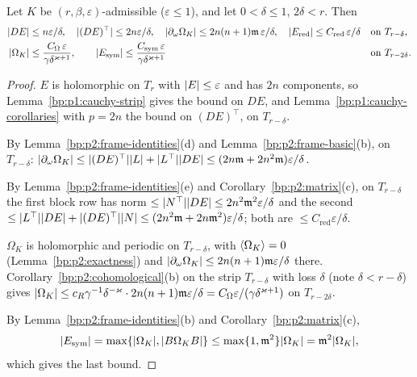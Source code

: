 \begin{lemma}\label{bp:p2:geometry}
Let $K$ be $(r,\beta,\varepsilon)$-admissible ($\varepsilon\le1$), and let $0<\delta\le1$, $2\delta<r$.
Then
\begin{align*}
\lvert DE\rvert&\le n\varepsilon/\delta,\quad\lvert (DE)^\top\rvert\le2n\varepsilon/\delta,\quad
\lvert \partial_\omega\Omega_K\rvert\le2n(n+1)\mathfrak m\,\varepsilon/\delta,\quad
\lvert E_{\mathrm{red}}\rvert\le C_{\mathrm{red}}\,\varepsilon/\delta&&\text{on }T_{r-\delta},\\
\lvert \Omega_K\rvert&\le\frac{C_\Omega\,\varepsilon}{\gamma\delta^{\varkappa+1}},\qquad
\lvert E_{\mathrm{sym}}\rvert\le\frac{C_{\mathrm{sym}}\,\varepsilon}{\gamma\delta^{\varkappa+1}}&&\text{on }
T_{r-2\delta}.
\end{align*}
\end{lemma}

\begin{proof}
\label{step:p2:geo-de}
$E$ is holomorphic on $T_r$ with $\lvert E\rvert\le\varepsilon$ and has $2n$ components, so
Lemma~\ref{bp:p1:cauchy-strip} gives the bound on $DE$, and Lemma~\ref{bp:p1:cauchy-corollaries} with
$p=2n$ the bound on $(DE)^\top$, on $T_{r-\delta}$.

\label{step:p2:geo-domegak}
By Lemma~\ref{bp:p2:frame-identities}(d) and Lemma~\ref{bp:p2:frame-basic}(b), on $T_{r-\delta}$:
$\lvert \partial_\omega\Omega_K\rvert\le\lvert (DE)^\top\rvert\lvert L\rvert+\lvert L^\top\rvert\lvert DE\rvert\le
(2n\mathfrak m+2n^2\mathfrak m)\varepsilon/\delta$.

\label{step:p2:geo-ered}
By Lemma~\ref{bp:p2:frame-identities}(e) and Corollary~\ref{bp:p2:matrix}(c), on $T_{r-\delta}$ the first
block row has norm $\le\lvert N^\top\rvert\lvert DE\rvert\le2n^2\mathfrak m^2\varepsilon/\delta$ and the second
$\le\lvert L^\top\rvert\lvert DE\rvert+\lvert (DE)^\top\rvert\lvert N\rvert\le(2n^2\mathfrak m+2n\mathfrak m^2)\varepsilon/\delta$;
both are $\le C_{\mathrm{red}}\varepsilon/\delta$.

\label{step:p2:geo-omegak}
$\Omega_K$ is holomorphic and periodic on $T_{r-\delta}$, with $\langle \Omega_K\rangle=0$
(Lemma~\ref{bp:p2:exactness}) and $\lvert \partial_\omega\Omega_K\rvert\le2n(n+1)\mathfrak m\varepsilon/\delta$
there. Corollary~\ref{bp:p2:cohomological}(b) on the strip $T_{r-\delta}$ with loss $\delta$ (note
$\delta<r-\delta$) gives $\lvert \Omega_K\rvert\le c_R\gamma^{-1}\delta^{-\varkappa}\cdot2n(n+1)\mathfrak m
\varepsilon/\delta=C_\Omega\varepsilon/(\gamma\delta^{\varkappa+1})$ on $T_{r-2\delta}$.

\label{step:p2:geo-esym}
By Lemma~\ref{bp:p2:frame-identities}(b) and Corollary~\ref{bp:p2:matrix}(c),
\[
\lvert E_{\mathrm{sym}}\rvert=\max\{\lvert \Omega_K\rvert,\lvert B\Omega_KB\rvert\}\le\max\{1,\mathfrak m^2\}\lvert \Omega_K\rvert
=\mathfrak m^2\lvert \Omega_K\rvert,
\]
which gives the last bound.
\end{proof}

